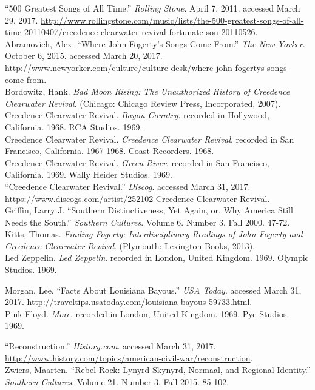 \documentclass[10pt]{article}
\begin{document}
\begin{hangparas}{15pt}{1}
``500 Greatest Songs of All Time.'' \textit{Rolling Stone}. April 7, 2011. accessed March 29, 2017. \url{http://www.rollingstone.com/music/lists/the-500-greatest-songs-of-all-time-20110407/creedence-clearwater-revival-fortunate-son-20110526}. \\

Abramovich, Alex. ``Where John Fogerty's Songs Come From.'' \textit{The New Yorker}. October 6, 2015. accessed March 20, 2017. \url{http://www.newyorker.com/culture/culture-desk/where-john-fogertys-songs-come-from}. \\

Bordowitz, Hank. \textit{Bad Moon Rising: The Unauthorized History of Creedence Clearwater Revival}. (Chicago: Chicago Review Press, Incorporated, 2007). \\

Creedence Clearwater Revival. \textit{Bayou Country}. recorded in Hollywood, California. 1968. RCA Studios. 1969. \\

Creedence Clearwater Revival. \textit{Creedence Clearwater Revival}. recorded in San Francisco, California. 1967-1968. Coast Recorders. 1968. \\

Creedence Clearwater Revival. \textit{Green River}. recorded in San Francisco, California. 1969. Wally Heider Studios. 1969. \\

``Creedence Clearwater Revival.'' \textit{Discog}. accessed March 31, 2017. \url{https://www.discogs.com/artist/252102-Creedence-Clearwater-Revival}. \\

Griffin, Larry J. ``Southern Distinctiveness, Yet Again, or, Why America Still Needs the South.'' \textit{Southern Cultures}. Volume 6. Number 3. Fall 2000. 47-72. \\

Kitts, Thomas. \textit{Finding Fogerty: Interdisciplinary Readings of John Fogerty and Creedence Clearwater Revival}. (Plymouth: Lexington Books, 2013). \\

Led Zeppelin. \textit{Led Zeppelin}. recorded in London, United Kingdom. 1969. Olympic Studios. 1969.

Morgan, Lee. ``Facts About Louisiana Bayous.'' \textit{USA Today}. accessed March 31, 2017. \url{http://traveltips.usatoday.com/louisiana-bayous-59733.html}. \\

Pink Floyd. \textit{More}. recorded in London, United Kingdom. 1969. Pye Studios. 1969.

``Reconstruction.'' \textit{History.com}. accessed March 31, 2017. \url{http://www.history.com/topics/american-civil-war/reconstruction}. \\

Zwiers, Maarten. ``Rebel Rock: Lynyrd Skynyrd, Normaal, and Regional Identity.'' \textit{Southern Cultures}. Volume 21. Number 3. Fall 2015. 85-102. \\
\end{hangparas}
\end{document}
